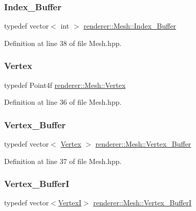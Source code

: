 \subsubsection{\texorpdfstring{Index\_Buffer}{Index\_Buffer}}
{\footnotesize\ttfamily typedef vector$<$ int $>$ \mbox{\hyperlink{classrenderer_1_1_mesh_a6a226cb85370a00787fe01f70a0b5ca2}{renderer\+::\+Mesh\+::\+Index\+\_\+\+Buffer}}}



Definition at line 38 of file Mesh.\+hpp.

\mbox{\label{classrenderer_1_1_mesh_ab0cb2995275ebaa8ae9e5fbb5519b7f3}} 
\subsubsection{\texorpdfstring{Vertex}{Vertex}}
{\footnotesize\ttfamily typedef Point4f \mbox{\hyperlink{classrenderer_1_1_mesh_ab0cb2995275ebaa8ae9e5fbb5519b7f3}{renderer\+::\+Mesh\+::\+Vertex}}}



Definition at line 36 of file Mesh.\+hpp.

\mbox{\label{classrenderer_1_1_mesh_a8c848a95f65fb25f6dc94dcb8879cf8b}} 
\subsubsection{\texorpdfstring{Vertex\_Buffer}{Vertex\_Buffer}}
{\footnotesize\ttfamily typedef vector$<$ \mbox{\hyperlink{classrenderer_1_1_mesh_ab0cb2995275ebaa8ae9e5fbb5519b7f3}{Vertex}} $>$ \mbox{\hyperlink{classrenderer_1_1_mesh_a8c848a95f65fb25f6dc94dcb8879cf8b}{renderer\+::\+Mesh\+::\+Vertex\+\_\+\+Buffer}}}



Definition at line 37 of file Mesh.\+hpp.

\mbox{\label{classrenderer_1_1_mesh_ac5074bb370a7062d07e11150de94e8be}} 
\subsubsection{\texorpdfstring{Vertex\_BufferI}{Vertex\_BufferI}}
{\footnotesize\ttfamily typedef vector$<$\mbox{\hyperlink{classrenderer_1_1_mesh_a5fd87426b3c8820d68414531423446fc}{VertexI}}$>$ \mbox{\hyperlink{classrenderer_1_1_mesh_ac5074bb370a7062d07e11150de94e8be}{renderer\+::\+Mesh\+::\+Vertex\+\_\+\+BufferI}}}



